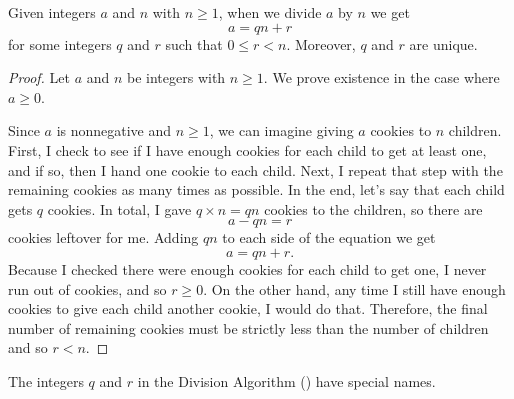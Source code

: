 \begin{thm}
\label{thm_div_alg}
Given integers $a$ and $n$ with $n \ge 1$, when we divide $a$ by $n$ we get $$a = qn + r$$ for some integers $q$ and $r$ such that $0 \le r < n$.  Moreover, $q$ and $r$ are unique.

\begin{proof}
    Let $a$ and $n$ be integers with $n \ge 1$.  We prove existence in the case where $a \ge 0$. %
    
    Since $a$ is nonnegative and $n \ge 1$, we can imagine giving $a$ cookies to $n$ children. First, I check to see if I have enough cookies for each child to get at least one, and if so, then I hand one cookie to each child.  Next, I repeat that step with the remaining cookies as many times as possible.  In the end, let's say that each child gets $q$ cookies.  In total, I gave $q \times n=qn$ cookies to the children, so there are $$a-qn=r$$ cookies leftover for me.  Adding $qn$ to each side of the equation we get $$a = qn+r.$$  Because I checked there were enough cookies for each child to get one, I never run out of cookies, and so $r \ge 0$.  On the other hand, any time I still have enough cookies to give each child another cookie, I would do that.  Therefore, the final number of remaining cookies must be strictly less than the number of children and so $r <n$.    
\end{proof}
\end{thm}

The integers $q$ and $r$ in the Division Algorithm () have special names.

